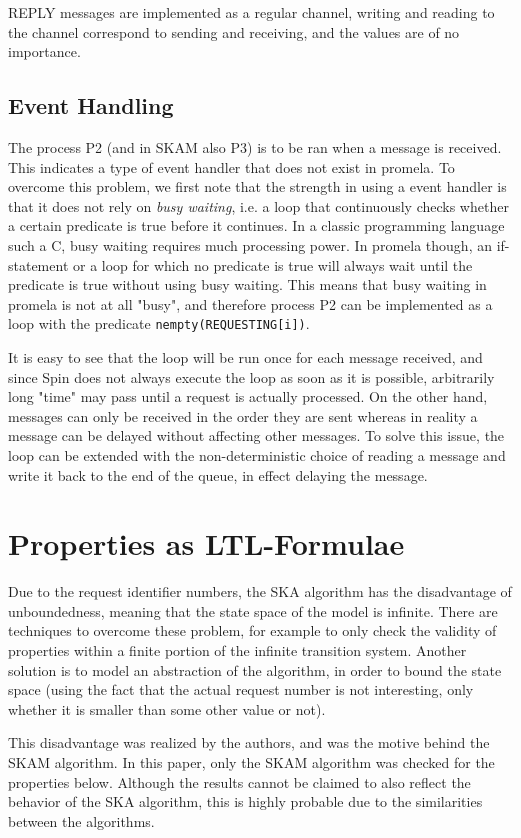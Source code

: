 \documentclass[a4paper,12pt]{llncs}
\begin{document}
REPLY messages are implemented as a regular channel, writing and reading to the channel correspond to sending and receiving, and the values are of no importance.

\subsection{Event Handling}
The process P2 (and in SKAM also P3) is to be ran when a message is received. This indicates a type of event handler that does not exist in promela. To overcome this problem, we first note that the strength in using a event handler is that it does not rely on \emph{busy waiting}, i.e. a loop that continuously checks whether a certain predicate is true before it continues. In a classic programming language such a C, busy waiting requires much processing power. In promela though, an if-statement or a loop for which no predicate is true will always wait until the predicate is true without using busy waiting. This means that busy waiting in promela is not at all "busy", and therefore  process P2 can be implemented as a loop with the predicate \texttt{nempty(REQUESTING[i])}.

It is easy to see that the loop will be run once for each message received, and since Spin does not always execute the loop as soon as it is possible, arbitrarily long "time" may pass until a request is actually processed. On the other hand, messages can only be received in the order they are sent whereas in reality a message can be delayed without affecting other messages. To solve this issue, the loop can be extended with the non-deterministic choice of reading a message and write it back to the end of the queue, in effect delaying the message.


\section{Properties as LTL-Formulae}
Due to the request identifier numbers, the SKA algorithm has the disadvantage of unboundedness, meaning that the state space of the model is infinite. There are techniques to overcome these problem, for example to only check the validity of properties within a finite portion of the infinite transition system. Another solution is to model an abstraction of the algorithm, in order to bound the state space (using the fact that the actual request number is not interesting, only whether it is smaller than some other value or not).

This disadvantage was realized by the authors, and was the motive behind the SKAM algorithm. In this paper, only the SKAM algorithm was checked for the properties below. Although the results cannot be claimed to also reflect the behavior of the SKA algorithm, this is highly probable due to the similarities between the algorithms.
\end{document}

